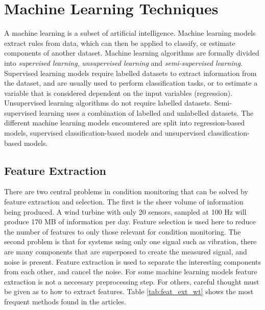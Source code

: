 \section{Machine Learning Techniques}
A machine learning is a subset of artificial intelligence. 
Machine learning models extract rules from data, which can then be applied to classify, or estimate components of another dataset. 
Machine learning algorithms are formally divided into \textit{supervised learning}, \textit{unsupervised learning} and \textit{semi-supervised learning}. 
Supervised learning models require labelled datasets to extract information from the dataset, and are usually used to perform classification tasks, or to estimate a variable that is considered dependent on the input variables (regression). 
Unsupervised learning algorithms do not require labelled datasets. 
Semi-supervised learning uses a combination of labelled and unlabelled datasets. 
The different machine learning models encountered are split into regression-based models, supervised classification-based models and unsupervised classification-based models. 


\subsection{Feature Extraction}
There are two central problems in condition monitoring that can be solved by feature extraction and selection. 
The first is the sheer volume of information being produced. 
A wind turbine with only 20 sensors, sampled at 100 Hz will produce 170 MB of information per day. 
Feature selection is used here to reduce the number of features to only those relevant for condition monitoring. 
The second problem is that for systems using only one signal such as vibration, there are many components that are superposed to create the measured signal, and noise is present. 
Feature extraction is used to separate the interesting components from each other, and cancel the noise. 
For some machine learning models feature extraction is not a neccesary preprocessing step. 
For others, careful thought must be given as to how to extract features. 
Table \ref{tab:feat_ext_wt} shows the most frequent methods found in the articles. \bigskip

